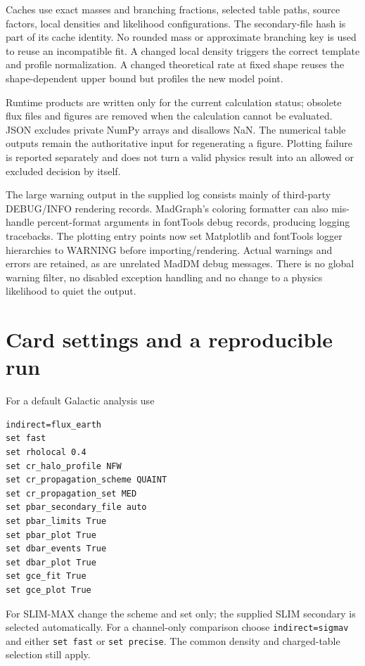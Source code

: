 \documentclass[11pt,a4paper]{article}
\begin{document}
Caches use exact masses and branching fractions, selected table paths, source factors, local densities and likelihood configurations. The secondary-file hash is part of its cache identity. No rounded mass or approximate branching key is used to reuse an incompatible fit. A changed local density triggers the correct template and profile normalization. A changed theoretical rate at fixed shape reuses the shape-dependent upper bound but profiles the new model point.

Runtime products are written only for the current calculation status; obsolete flux files and figures are removed when the calculation cannot be evaluated. JSON excludes private NumPy arrays and disallows NaN. The numerical table outputs remain the authoritative input for regenerating a figure. Plotting failure is reported separately and does not turn a valid physics result into an allowed or excluded decision by itself.

The large warning output in the supplied log consists mainly of third-party DEBUG/INFO rendering records. MadGraph's coloring formatter can also mis-handle percent-format arguments in fontTools debug records, producing logging tracebacks. The plotting entry points now set Matplotlib and fontTools logger hierarchies to WARNING before importing/rendering. Actual warnings and errors are retained, as are unrelated MadDM debug messages. There is no global warning filter, no disabled exception handling and no change to a physics likelihood to quiet the output.

\section{Card settings and a reproducible run}
For a default Galactic analysis use
\begin{lstlisting}
indirect=flux_earth
set fast
set rholocal 0.4
set cr_halo_profile NFW
set cr_propagation_scheme QUAINT
set cr_propagation_set MED
set pbar_secondary_file auto
set pbar_limits True
set pbar_plot True
set dbar_events True
set dbar_plot True
set gce_fit True
set gce_plot True
\end{lstlisting}
For SLIM-MAX change the scheme and set only; the supplied SLIM secondary is selected automatically. For a channel-only comparison choose \texttt{indirect=sigmav} and either \texttt{set fast} or \texttt{set precise}. The common density and charged-table selection still apply.
\end{document}
